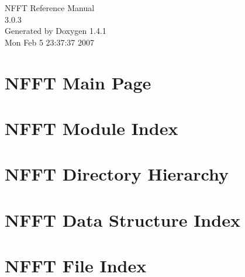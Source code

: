 \documentclass[a4paper]{book}
\begin{document}
\begin{titlepage}
\vspace*{7cm}
\begin{center}
{\Large NFFT Reference Manual\\[1ex]\large 3.0.3 }\\
\vspace*{1cm}
{\large Generated by Doxygen 1.4.1}\\
\vspace*{0.5cm}
{\small Mon Feb 5 23:37:37 2007}\\
\end{center}
\end{titlepage}
\clearemptydoublepage
{}
\tableofcontents
\clearemptydoublepage
{}
\chapter{NFFT Main Page}
\label{index}\hypertarget{index}{}
\chapter{NFFT Module Index}

\chapter{NFFT Directory Hierarchy}

\chapter{NFFT Data Structure Index}

\chapter{NFFT File Index}

\end{document}
